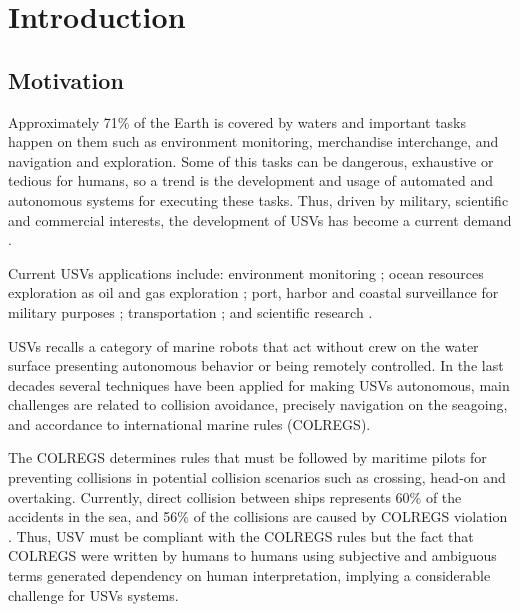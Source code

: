 \chapter{Introduction \label{chap:intro}}
    
    \section{Motivation}
    
    Approximately 71\% of the Earth is covered by waters and important tasks happen on them such as environment monitoring, merchandise interchange, and navigation and exploration. 
    Some of this tasks can be dangerous, exhaustive or tedious for humans, so a trend is the development and usage of automated and autonomous systems for executing these tasks. Thus, driven by military, scientific and commercial interests, the development of \acp{USV} has become a current demand \cite{Liu2016Unmanned}.
    
    Current \acp{USV} applications include: environment monitoring \cite{Caccia2005Sampling}; ocean resources exploration as oil and gas exploration \cite{Pastore2010Improving}; port, harbor and coastal surveillance for military purposes \cite{Caccia2007unmanned, Pastore2010Improving, Svec2011aAutomated}; transportation \cite{Kiencke2005Impact}; and scientific research \cite{Yan2010Development}.
    
    \acp{USV} recalls a category of marine robots that act without crew on the water surface presenting autonomous behavior or being remotely controlled. In the last decades several techniques have been applied for making \acp{USV} autonomous, main challenges are related to collision avoidance, precisely navigation on the seagoing, and accordance to international marine rules (\ac{COLREGS}).
    
    The \acs{COLREGS} determines rules that must be followed by maritime pilots for preventing collisions in potential collision scenarios such as crossing, head-on and overtaking. Currently, direct collision between ships represents 60\% of the accidents in the sea, and 56\% of the collisions are caused by \acs{COLREGS} violation \cite{Liu2016Unmanned, Campbell2012Review_COLREGs}. Thus, \ac{USV} must be compliant with the \ac{COLREGS} rules but the fact that \ac{COLREGS} were written by humans to humans using subjective and ambiguous terms generated dependency on human interpretation, implying a considerable challenge for \acp{USV} systems.
    
